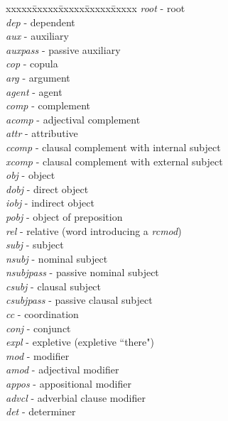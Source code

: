 \documentclass[11pt,letter]{article}
\begin{document}
\begin{tabbing}
xxxxx\= xxxxx\= xxxxx\= xxxxx\= xxxxx \kill
\emph{root} - root\\
\emph{dep} - dependent \\
 \> \emph{aux} - auxiliary \\
 \> \> \emph{auxpass} - passive auxiliary\\
 \> \> \emph{cop} - copula\\
 \> \emph{arg} - argument \\
   \> \> \emph{agent} - agent\\
    \> \> \emph{comp} - complement \\
	  \> \> \> \emph{acomp} - adjectival complement \\
	  \> \> \> \emph{attr} - attributive \\
	  \> \> \> \emph{ccomp} - clausal complement with internal subject \\
      \> \> \> \emph{xcomp} -  clausal complement with external subject\\
      \> \> \> \emph{obj} - object \\
        \> \> \> \> \emph{dobj} - direct object \\
        \> \> \> \> \emph{iobj} - indirect object \\
        \> \> \> \> \emph{pobj} - object of preposition \\
      \> \> \> \emph{rel} - relative (word introducing a \emph{rcmod})\\
	\> \>  \emph{subj} - subject \\
	      \> \> \> \emph{nsubj} - nominal subject \\
	        \> \> \> \> \emph{nsubjpass} - passive nominal subject \\
	      \> \> \> \emph{csubj} - clausal subject \\
		  \> \> \> \> \emph{csubjpass} - passive clausal subject \\
 \> \emph{cc} - coordination \\
 \> \emph{conj} - conjunct \\
 \> \emph{expl} - expletive (expletive ``there") \\
 \> \emph{mod} - modifier \\
    \> \> \emph{amod} - adjectival modifier \\
    \> \> \emph{appos} - appositional modifier \\
    \> \> \emph{advcl} - adverbial clause modifier \\
    \> \> \emph{det} - determiner \\

\end{tabbing}
\end{document}
